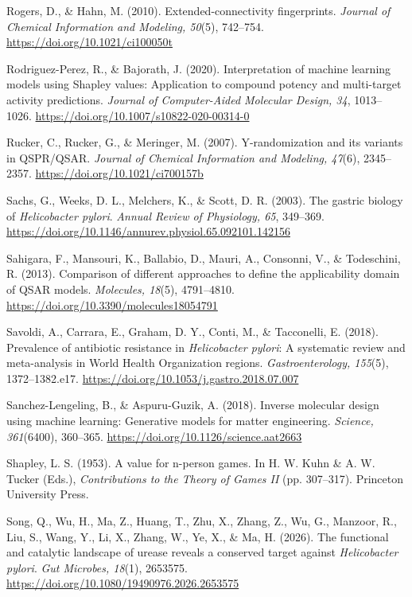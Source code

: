 \documentclass[11pt]{article}
\begin{document}
Rogers, D., \& Hahn, M. (2010). Extended-connectivity fingerprints. \textit{Journal of Chemical Information and Modeling, 50}(5), 742--754. \url{https://doi.org/10.1021/ci100050t}

Rodriguez-Perez, R., \& Bajorath, J. (2020). Interpretation of machine learning models using Shapley values: Application to compound potency and multi-target activity predictions. \textit{Journal of Computer-Aided Molecular Design, 34}, 1013--1026. \url{https://doi.org/10.1007/s10822-020-00314-0}

Rucker, C., Rucker, G., \& Meringer, M. (2007). Y-randomization and its variants in QSPR/QSAR. \textit{Journal of Chemical Information and Modeling, 47}(6), 2345--2357. \url{https://doi.org/10.1021/ci700157b}

Sachs, G., Weeks, D. L., Melchers, K., \& Scott, D. R. (2003). The gastric biology of \textit{Helicobacter pylori}. \textit{Annual Review of Physiology, 65}, 349--369. \url{https://doi.org/10.1146/annurev.physiol.65.092101.142156}

Sahigara, F., Mansouri, K., Ballabio, D., Mauri, A., Consonni, V., \& Todeschini, R. (2013). Comparison of different approaches to define the applicability domain of QSAR models. \textit{Molecules, 18}(5), 4791--4810. \url{https://doi.org/10.3390/molecules18054791}

Savoldi, A., Carrara, E., Graham, D. Y., Conti, M., \& Tacconelli, E. (2018). Prevalence of antibiotic resistance in \textit{Helicobacter pylori}: A systematic review and meta-analysis in World Health Organization regions. \textit{Gastroenterology, 155}(5), 1372--1382.e17. \url{https://doi.org/10.1053/j.gastro.2018.07.007}

Sanchez-Lengeling, B., \& Aspuru-Guzik, A. (2018). Inverse molecular design using machine learning: Generative models for matter engineering. \textit{Science, 361}(6400), 360--365. \url{https://doi.org/10.1126/science.aat2663}

Shapley, L. S. (1953). A value for n-person games. In H. W. Kuhn \& A. W. Tucker (Eds.), \textit{Contributions to the Theory of Games II} (pp. 307--317). Princeton University Press.

Song, Q., Wu, H., Ma, Z., Huang, T., Zhu, X., Zhang, Z., Wu, G., Manzoor, R., Liu, S., Wang, Y., Li, X., Zhang, W., Ye, X., \& Ma, H. (2026). The functional and catalytic landscape of urease reveals a conserved target against \textit{Helicobacter pylori}. \textit{Gut Microbes, 18}(1), 2653575. \url{https://doi.org/10.1080/19490976.2026.2653575}
\end{document}
